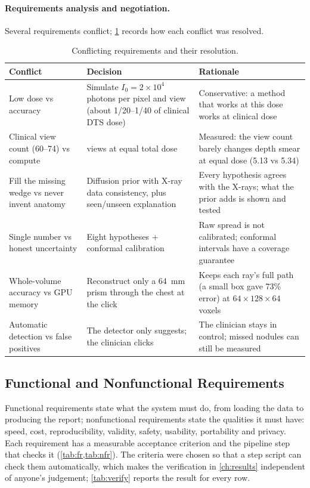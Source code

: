 \paragraph{Requirements analysis and negotiation.} Several requirements conflict; \cref{tab:conflicts} records how each conflict was resolved.

\begin{table}[!htbp]
\centering\small
\caption{Conflicting requirements and their resolution.}
\label{tab:conflicts}
\begin{tabularx}{\linewidth}{>{\raggedright\arraybackslash}p{3.4cm} >{\raggedright\arraybackslash}X >{\raggedright\arraybackslash}X}
\toprule
Conflict & Decision & Rationale \\
\midrule
Low dose vs accuracy & Simulate $I_0 = 2\times10^4$ photons per pixel and view (about 1/20--1/40 of clinical DTS dose) & Conservative: a method that works at this dose works at clinical dose \\
Clinical view count (60--74) vs compute & 15 views at equal total dose & Measured: the view count barely changes depth smear at equal dose (5.13 vs 5.34) \\
Fill the missing wedge vs never invent anatomy & Diffusion prior with X-ray data consistency, plus seen/unseen explanation & Every hypothesis agrees with the X-rays; what the prior adds is shown and tested \\
Single number vs honest uncertainty & Eight hypotheses + conformal calibration & Raw spread is not calibrated; conformal intervals have a coverage guarantee \\
Whole-volume accuracy vs GPU memory & Reconstruct only a 64~mm prism through the chest at the click & Keeps each ray's full path (a small box gave 73\% error) at $64{\times}128{\times}64$ voxels \\
Automatic detection vs false positives & The detector only suggests; the clinician clicks & The clinician stays in control; missed nodules can still be measured \\
\bottomrule
\end{tabularx}
\end{table}

\subsection{Functional and Nonfunctional Requirements}

Functional requirements state what the system must do, from loading the data to producing the report; nonfunctional requirements state the qualities it must have: speed, cost, reproducibility, validity, safety, usability, portability and privacy. Each requirement has a measurable acceptance criterion and the pipeline step that checks it (\cref{tab:fr,tab:nfr}). The criteria were chosen so that a step script can check them automatically, which makes the verification in \cref{ch:results} independent of anyone's judgement; \cref{tab:verify} reports the result for every row.

